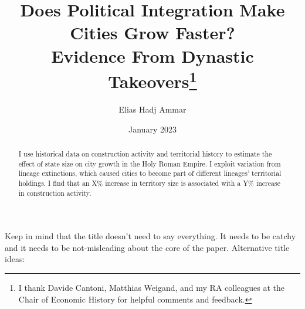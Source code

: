 \documentclass{article}
\title{Does Political Integration Make Cities Grow Faster?\\
Evidence From Dynastic Takeovers\footnote{I thank Davide Cantoni, Matthias Weigand, and my RA colleagues at the Chair of Economic History for helpful comments and feedback.}
}
\author{Elias Hadj Ammar}
\date{January 2023}
\begin{document}
\maketitle


\begin{abstract}
I use historical data on construction activity and territorial history to estimate the effect of state size on city growth in the Holy Roman Empire. I exploit variation from lineage extinctions, which caused cities to become part of different lineages' territorial holdings. I find that an X\% increase in territory size is associated with a Y\% increase in construction activity.
\end{abstract}

Keep in mind that the title doesn't need to say everything. It needs to be catchy and it needs to be not-misleading about the core of the paper.
Alternative title ideas: 
\end{document}
